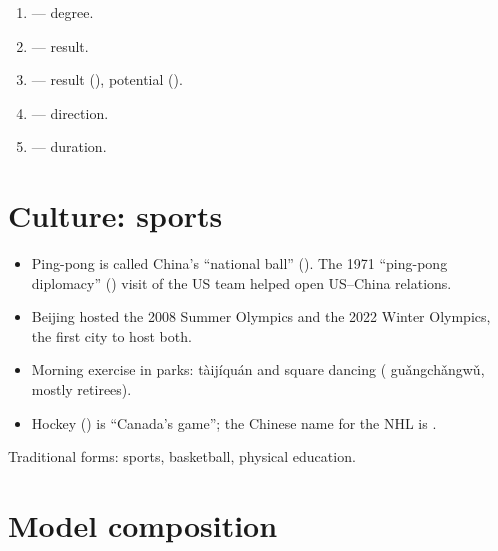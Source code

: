\begin{example}\leavevmode
\begin{enumerate}
  \item {} --- degree.
  \item {} --- result.
  \item {} --- result (), potential ().
  \item {} --- direction.
  \item {} --- duration.
\end{enumerate}
\end{example}

\section{Culture: sports}

\begin{aside}
\begin{itemize}
  \item Ping-pong is called China's ``national ball'' (). The 1971 ``ping-pong
        diplomacy'' () visit of the US team helped open US--China relations.
  \item Beijing hosted the 2008 Summer Olympics and the 2022 Winter Olympics, the first
        city to host both.
  \item Morning exercise in parks:  tàijíquán and square dancing
        ( guǎngchǎngwǔ, mostly retirees).
  \item Hockey () is ``Canada's game''; the Chinese name for the NHL is
        .
\end{itemize}
Traditional forms:  sports,  basketball,  physical education.
\end{aside}

\section{Model composition}


